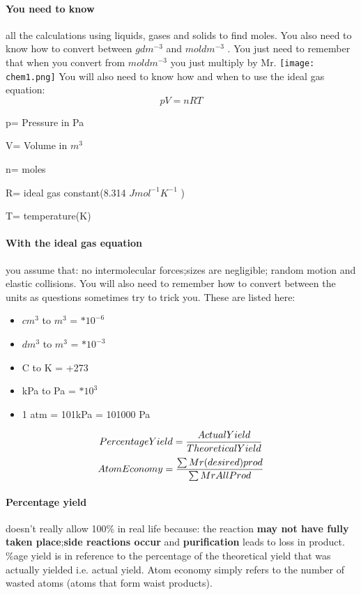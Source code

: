 \paragraph{You need to know}all the calculations using liquids, gases and solids to find moles. You also need to know how to convert between \(gdm^{-3}\) and \(moldm^{-3}\) . You just need to remember that when you convert from \(moldm^{-3}\) you just multiply by Mr.
\newline
\texttt{[image: chem1.png]}
\newline You will also need to know how and when to use the ideal gas equation:
\begin{equation}
pV=nRT
\end{equation}
\begin{center} p= Pressure in Pa

 V= Volume in \(m^3\) 

n= moles

R= ideal gas constant(8.314 \(Jmol^{-1}K^{-1}\) ) 

T= temperature(K) 
\end{center}
\paragraph{With the ideal gas equation} you assume that: no intermolecular forces;sizes are negligible; random motion and elastic collisions.
You will also need to remember how to convert between the units as questions sometimes try to trick you. These are listed here:
\begin{itemize}
\item \(cm^3\) to \(m^3\) = \(*10^{-6}\)
\item \(dm^3\) to \(m^3\) = \(*10^{-3}\)
\item \degree C to K = +273
\item kPa to Pa = \(*10^3\) 
\item 1 atm = 101kPa = 101000 Pa
\end{itemize}
\newpage
\begin{equation}
Percentage Yield= \frac{Actual Yield}{Theoretical Yield}\\
\end{equation}
\newline
\begin{equation}
Atom Economy= \frac{\sum Mr(desired) prod}{\sum Mr All Prod}\\
\end{equation}
\paragraph{Percentage yield} doesn't really allow 100\% in real life because: the reaction \textbf{may not have fully taken place};\textbf{side reactions occur} and \textbf{purification} leads to loss in product.
\%age yield is in reference to the percentage of the theoretical yield that was actually yielded i.e. actual yield. Atom economy simply refers to the number of wasted atoms (atoms that form waist products).
